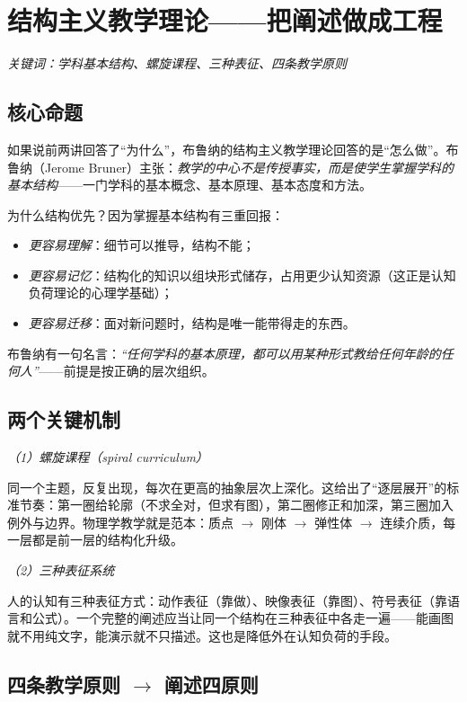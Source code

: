 \section{结构主义教学理论——把阐述做成工程}

\noindent\textit{关键词：学科基本结构、螺旋课程、三种表征、四条教学原则}

\subsection{核心命题}

如果说前两讲回答了“为什么”，布鲁纳的结构主义教学理论回答的是“怎么做”。布鲁纳（Jerome Bruner）主张：\textit{教学的中心不是传授事实，而是使学生掌握学科的基本结构}——一门学科的基本概念、基本原理、基本态度和方法。

为什么结构优先？因为掌握基本结构有三重回报：
\begin{itemize}
    \item \textit{更容易理解}：细节可以推导，结构不能；
    \item \textit{更容易记忆}：结构化的知识以组块形式储存，占用更少认知资源（这正是认知负荷理论的心理学基础）；
    \item \textit{更容易迁移}：面对新问题时，结构是唯一能带得走的东西。
\end{itemize}

布鲁纳有一句名言：\textit{“任何学科的基本原理，都可以用某种形式教给任何年龄的任何人”}——前提是按正确的层次组织。

\subsection{两个关键机制}

\nid\textit{（1）螺旋课程（spiral curriculum）}

同一个主题，反复出现，每次在更高的抽象层次上深化。这给出了“逐层展开”的标准节奏：第一圈给轮廓（不求全对，但求有图），第二圈修正和加深，第三圈加入例外与边界。物理学教学就是范本：质点 $\to$ 刚体 $\to$ 弹性体 $\to$ 连续介质，每一层都是前一层的结构化升级。

\nid\textit{（2）三种表征系统}

人的认知有三种表征方式：动作表征（靠做）、映像表征（靠图）、符号表征（靠语言和公式）。一个完整的阐述应当让同一个结构在三种表征中各走一遍——能画图就不用纯文字，能演示就不只描述。这也是降低外在认知负荷的手段。

\subsection{四条教学原则 $\to$ 阐述四原则}

